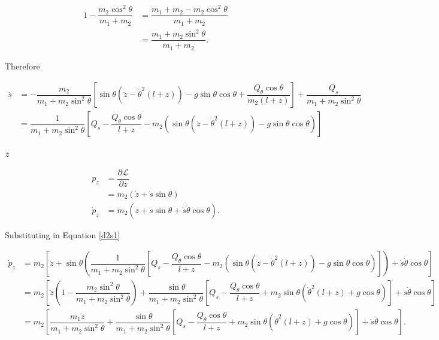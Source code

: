 \documentclass[12pt,a4paper,portrait]{article}
\newcommand{\lag}{\mathcal{L}}
\begin{document}
\begin{align*}
	1-\dfrac{m_2\cos^2{\theta}}{m_1+m_2} &= \dfrac{m_1+m_2 - m_2\cos^2{\theta}}{m_1+m_2} \\
	&= \dfrac{m_1+m_2\sin^2{\theta}}{m_1+m_2}.
\end{align*}

Therefore

\begin{align}
	\ddot{s} &= -\dfrac{m_2}{m_1+m_2\sin^2{\theta}}\left[\sin{\theta}(\ddot{z}-\dot{\theta}^2(l+z)) - g\sin{\theta}\cos{\theta} + \dfrac{Q_{\theta}\cos{\theta}}{m_2(l+z)}\right] + \dfrac{Q_s}{m_1+m_2\sin^2{\theta}} \nonumber\\
	&= \dfrac{1}{m_1+m_2\sin^2{\theta}}\left[Q_s - \dfrac{Q_{\theta}\cos{\theta}}{l+z} - m_2\left(\sin{\theta}(\ddot{z}-\dot{\theta}^2(l+z)) - g\sin{\theta}\cos{\theta}\right)\right] \label{d2s1}
\end{align}

\subsubsection{$z$}
\begin{align*}
	p_z &= \dfrac{\partial \lag}{\partial \dot{z}} \\
	&= m_2(\dot{z} + \dot{s}\sin{\theta}) \\
	\dot{p}_z &= m_2 (\ddot{z} + \ddot{s}\sin{\theta} + \dot{s}\dot{\theta}\cos{\theta}).
\end{align*}

Substituting in Equation \eqref{d2s1}

\begin{align*}
	\dot{p}_z &= m_2 \left[\ddot{z} + \sin{\theta}\left(\dfrac{1}{m_1+m_2\sin^2{\theta}}\left[Q_s - \dfrac{Q_{\theta}\cos{\theta}}{l+z} - m_2\left(\sin{\theta}(\ddot{z}-\dot{\theta}^2(l+z)) - g\sin{\theta}\cos{\theta}\right)\right]\right) + \dot{s}\dot{\theta}\cos{\theta}\right]\\
	&= m_2 \left[\ddot{z}\left(1-\dfrac{m_2\sin^2{\theta}}{m_1+m_2\sin^2{\theta}}\right) + \dfrac{\sin{\theta}}{m_1+m_2\sin^2{\theta}}\left[Q_s - \dfrac{Q_{\theta}\cos{\theta}}{l+z} + m_2\sin{\theta}\left(\dot{\theta}^2(l+z) + g\cos{\theta}\right)\right] + \dot{s}\dot{\theta}\cos{\theta}\right] \\
	&=m_2 \left[\dfrac{m_1\ddot{z}}{m_1+m_2\sin^2{\theta}} + \dfrac{\sin{\theta}}{m_1+m_2\sin^2{\theta}}\left[Q_s - \dfrac{Q_{\theta}\cos{\theta}}{l+z} + m_2\sin{\theta}\left(\dot{\theta}^2(l+z) + g\cos{\theta}\right)\right] + \dot{s}\dot{\theta}\cos{\theta}\right].
\end{align*}
\end{document}
